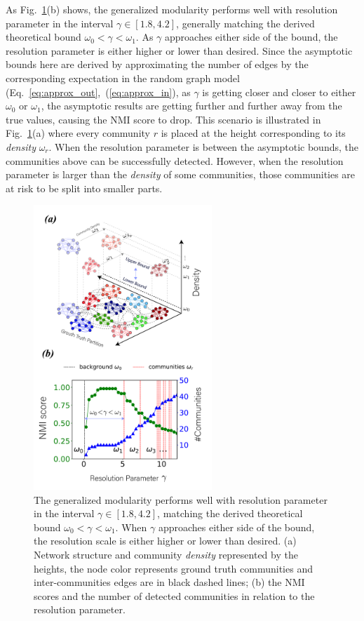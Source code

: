 As Fig.~\ref{fig:gamma_error_exp}(b) shows, the generalized modularity performs well with resolution parameter in the interval $\gamma\in[1.8,4.2]$, generally matching the derived theoretical bound $\omega_0<\gamma<\omega_1$. As $\gamma$ approaches either side of the bound, the resolution parameter is either higher or lower than desired. Since the asymptotic bounds here are derived by approximating the number of edges by the corresponding expectation in the random graph model (Eq.~\ref{eq:approx_out},~(\ref{eq:approx_in}), as $\gamma$ is getting closer and closer to either $\omega_0$ or $\omega_1$, the asymptotic results are getting further and further away from the true values, causing the NMI score to drop. This scenario is illustrated in Fig.~\ref{fig:gamma_error_exp}(a) where every community $r$ is placed at the height corresponding to its {\it density} $\omega_r$. When the resolution parameter is between the asymptotic bounds, the communities above can be successfully detected. However, when the resolution parameter is larger than the {\it density} of some communities, those communities are at risk to be split into smaller parts.

\begin{figure}
    \centering
    \includegraphics[width=0.6\textwidth]{img/chap2/Fig2.pdf}
    \caption{The generalized modularity performs well with resolution parameter in the interval $\gamma\in[1.8,4.2]$, matching the derived theoretical bound $\omega_0<\gamma<\omega_1$. When $\gamma$ approaches either side of the bound, the resolution scale is either higher or lower than desired. (a) Network structure and community {\it density} represented by the heights, the node color represents ground truth communities and inter-communities edges are in black dashed lines; (b) the NMI scores and the number of detected communities in relation to the resolution parameter.}
    \label{fig:gamma_error_exp}
\end{figure}

